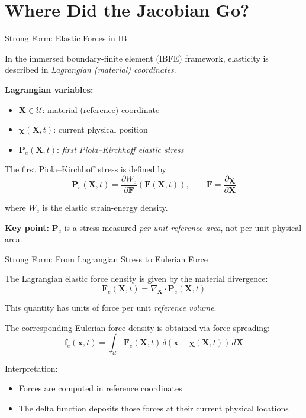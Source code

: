 \documentclass{beamer}
\begin{document}
\section{Where Did the Jacobian Go?}

\begin{frame}{Strong Form: Elastic Forces in IB}

In the immersed boundary-finite element (IBFE) framework, elasticity is described in
\emph{Lagrangian (material) coordinates}.

\medskip

\textbf{Lagrangian variables:}
\begin{itemize}
    \item $\mathbf{X} \in \mathcal{U}$: material (reference) coordinate
    \item $\boldsymbol{\chi}(\mathbf{X},t)$: current physical position
    \item $\mathbf{P}_e(\mathbf{X},t)$: \emph{first Piola--Kirchhoff elastic stress}
\end{itemize}

\medskip

The first Piola--Kirchhoff stress is defined by
\[
\mathbf{P}_e(\mathbf{X},t)
=
\frac{\partial W_e}{\partial \mathbf{F}}(\mathbf{F}(\mathbf{X},t)),
\qquad
\mathbf{F} = \frac{\partial \boldsymbol{\chi}}{\partial \mathbf{X}}
\]

where $W_e$ is the elastic strain-energy density.

\medskip

\textbf{Key point:}  
$\mathbf{P}_e$ is a stress measured \emph{per unit reference area}, not per unit physical area.

\end{frame}

\begin{frame}{Strong Form: From Lagrangian Stress to Eulerian Force}

The Lagrangian elastic force density is given by the material divergence:
\[
\mathbf{F}_e(\mathbf{X},t)
=
\nabla_{\mathbf{X}} \cdot \mathbf{P}_e(\mathbf{X},t)
\]

This quantity has units of force per unit \emph{reference volume}.

\medskip

The corresponding Eulerian force density is obtained via force spreading:
\[
\mathbf{f}_e(\mathbf{x},t)
=
\int_{\mathcal{U}}
\mathbf{F}_e(\mathbf{X},t)\,
\delta(\mathbf{x}-\boldsymbol{\chi}(\mathbf{X},t))\,d\mathbf{X}
\]

\medskip

Interpretation:
\begin{itemize}
    \item Forces are computed in reference coordinates
    \item The delta function deposits those forces at their current physical locations
\end{itemize}

\end{frame}
\end{document}
